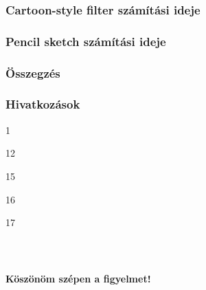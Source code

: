 \documentclass{beamer}
\begin{document}
\begin{frame}[fragile]
\frametitle{Cartoon-style filter számítási ideje}

\end{frame}

\begin{frame}[fragile]
\frametitle{Pencil sketch számítási ideje}

\end{frame}

\begin{frame}[fragile]
\frametitle{Összegzés}

\end{frame}

\begin{frame}[fragile]
\frametitle{Hivatkozások}

1

12

15

16

17

\end{frame}

\begin{frame}[fragile]
    \frametitle{\ }

\begin{center}
\Large \textbf{Köszönöm szépen a figyelmet!}
\end{center}

\end{frame}
\end{document}
